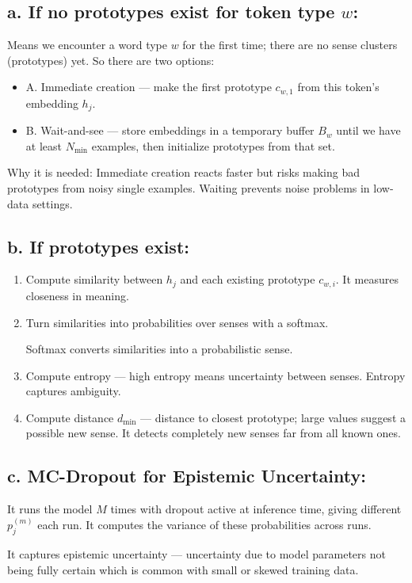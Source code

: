\documentclass[a4paper,12pt]{article}
\begin{document}
\subsection*{a. If no prototypes exist for token type $w$:}
Means we encounter a word type $w$ for the first time; there are no sense clusters (prototypes) yet. So there are two options:

\begin{itemize}
    \item A. Immediate creation — make the first prototype $c_{w,1}$ from this token’s embedding $h_j$.
    \item B. Wait-and-see — store embeddings in a temporary buffer $B_w$ until we have at least $N_{\min}$ examples, then initialize prototypes from that set.
\end{itemize}

Why it is needed: Immediate creation reacts faster but risks making bad prototypes from noisy single examples. Waiting prevents noise problems in low-data settings.

\subsection*{b. If prototypes exist:}
\begin{enumerate}
    \item Compute similarity between $h_j$ and each existing prototype $c_{w,i}$. It measures closeness in meaning.
    \item Turn similarities into probabilities over senses with a softmax.

    Softmax converts similarities into a probabilistic sense.
    \item Compute entropy --- high entropy means uncertainty between senses. Entropy captures ambiguity.
    \item Compute distance $d_{\min}$ --- distance to closest prototype; large values suggest a possible new sense. It detects completely new senses far from all known ones.
\end{enumerate}

\subsection*{c. MC-Dropout for Epistemic Uncertainty:}
It runs the model $M$ times with dropout active at inference time, giving different $p_j^{(m)}$ each run. It computes the variance of these probabilities across runs.

It captures epistemic uncertainty --- uncertainty due to model parameters not being fully certain which is common with small or skewed training data.
\end{document}
